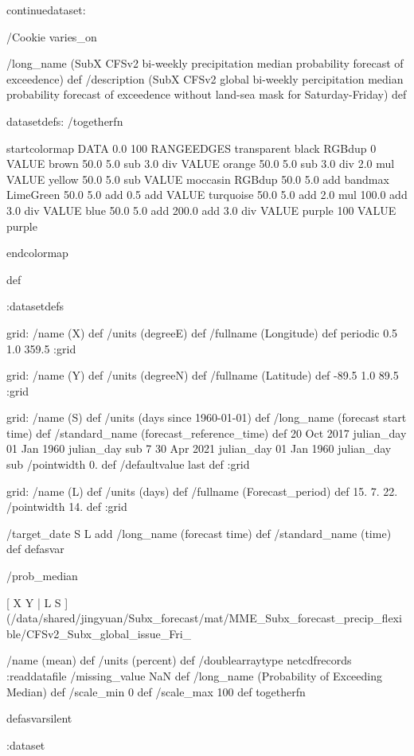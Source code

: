 \begin{ingrid}

continuedataset:


/Cookie varies_on


/long_name (SubX CFSv2 bi-weekly precipitation median probability forecast of exceedence) def
/description (SubX CFSv2 global bi-weekly percipitation median probability forecast of exceedence without land-sea mask for Saturday-Friday) def

datasetdefs:
/togetherfn {
startcolormap 
DATA 0.0 100 RANGEEDGES
    transparent black RGBdup
       0 VALUE
       brown 50.0
         5.0 sub
         3.0 div
         VALUE
         orange 50.0
          5.0 sub
          3.0 div
          2.0 mul
          VALUE
          yellow 50.0
           5.0 sub
           VALUE
          moccasin RGBdup 50.0
             5.0 add
             bandmax
             LimeGreen 50.0
              5.0 add
              0.5 add
              VALUE
              turquoise 50.0
               5.0 add
               2.0 mul
               100.0 add
               3.0 div
               VALUE
               blue 50.0
                5.0 add
                200.0 add
                3.0 div
                VALUE
               purple
                100 VALUE
                purple

endcolormap
} def 

:datasetdefs


grid:
/name (X) def
/units (degreeE) def
/fullname (Longitude) def
periodic
0.5 1.0 359.5
:grid

grid:
/name (Y) def
/units (degreeN) def
/fullname (Latitude) def
-89.5 1.0 89.5
:grid


grid:
/name (S) def
/units (days since 1960-01-01) def
/long_name (forecast start time) def
/standard_name (forecast_reference_time) def
20 Oct 2017 julian_day 01 Jan 1960 julian_day sub
7
30 Apr 2021 julian_day 01 Jan 1960 julian_day sub
/pointwidth 0. def
/defaultvalue { last } def
:grid

grid:
/name (L) def
/units (days) def
/fullname (Forecast_period) def
15. 7. 22.
/pointwidth 14. def
:grid


/target_date { S L add /long_name (forecast time) def /standard_name (time) def } defasvar

/prob_median {

[ X Y | L S ] (/data/shared/jingyuan/Subx_forecast/mat/MME_Subx_forecast_precip_flexible/CFSv2_Subx_global_issue_Fri_%

/name (mean) def
/units (percent) def
/doublearraytype netcdfrecords :readdatafile
/missing_value NaN def
/long_name (Probability of Exceeding Median) def
/scale_min 0 def
/scale_max 100 def
togetherfn
} defasvarsilent


:dataset
\end{ingrid}
